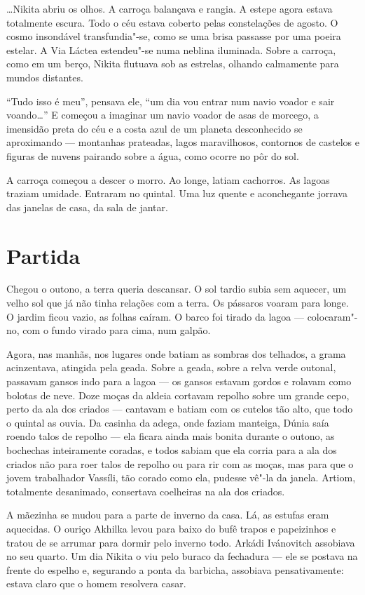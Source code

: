 \ldots{}Nikita abriu os olhos. A carroça balançava e rangia. A estepe agora
estava totalmente escura. Todo o céu estava coberto pelas constelações
de agosto. O cosmo insondável transfundia"-se, como se uma brisa passasse
por uma poeira estelar. A Via Láctea estendeu"-se numa neblina iluminada.
Sobre a carroça, como em um berço, Nikita flutuava sob as estrelas,
olhando calmamente para mundos distantes.

``Tudo isso é meu'', pensava ele, ``um dia vou entrar num navio voador e
sair voando\ldots{}'' E começou a imaginar um navio voador de asas de
morcego, a imensidão preta do céu e a costa azul de um planeta
desconhecido se aproximando --- montanhas prateadas, lagos maravilhosos,
contornos de castelos e figuras de nuvens pairando sobre a água, como
ocorre no pôr do sol.

A carroça começou a descer o morro. Ao longe, latiam cachorros. As
lagoas traziam umidade. Entraram no quintal. Uma luz quente e
aconchegante jorrava das janelas de casa, da sala de jantar.

\chapter{Partida}

Chegou o outono, a terra queria descansar. O sol tardio subia sem
aquecer, um velho sol que já não tinha relações com a terra. Os pássaros
voaram para longe. O jardim ficou vazio, as folhas caíram. O barco foi
tirado da lagoa --- colocaram"-no, com o fundo virado para cima, num
galpão.

Agora, nas manhãs, nos lugares onde batiam as sombras dos telhados, a
grama acinzentava, atingida pela geada. Sobre a geada, sobre a relva
verde outonal, passavam gansos indo para a lagoa --- os gansos estavam
gordos e rolavam como bolotas de neve. Doze moças da aldeia cortavam
repolho sobre um grande cepo, perto da ala dos criados --- cantavam e
batiam com os cutelos tão alto, que todo o quintal as ouvia. Da casinha
da adega, onde faziam manteiga, Dúnia saía roendo talos de repolho ---
ela ficara ainda mais bonita durante o outono, as bochechas inteiramente
coradas, e todos sabiam que ela corria para a ala dos criados não para
roer talos de repolho ou para rir com as moças, mas para que o jovem
trabalhador Vassíli, tão corado como ela, pudesse vê"-la da janela.
Artiom, totalmente desanimado, consertava coelheiras na ala dos criados.

A mãezinha se mudou para a parte de inverno da casa. Lá, as estufas
eram aquecidas. O ouriço Akhilka levou para baixo do bufê trapos e
papeizinhos e tratou de se arrumar para dormir pelo inverno todo. Arkádi
Ivánovitch assobiava no seu quarto. Um dia Nikita o viu pelo buraco da
fechadura --- ele se postava na frente do espelho e, segurando a ponta da
barbicha, assobiava pensativamente: estava claro que o homem resolvera
casar.

